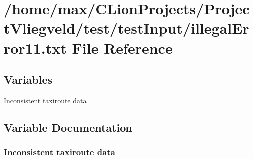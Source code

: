 \hypertarget{illegalError11_8txt}{}\section{/home/max/\+C\+Lion\+Projects/\+Project\+Vliegveld/test/test\+Input/illegal\+Error11.txt File Reference}
\label{illegalError11_8txt}
\subsection*{Variables}
\begin{DoxyCompactItemize}
\item 
Inconsistent taxiroute \hyperlink{illegalError11_8txt_a2db91b8ae553a8888179c8dd6e74453f}{data}
\end{DoxyCompactItemize}


\subsection{Variable Documentation}
\subsubsection[{\texorpdfstring{data}{data}}]{\setlength{\rightskip}{0pt plus 5cm}Inconsistent taxiroute data}\hypertarget{illegalError11_8txt_a2db91b8ae553a8888179c8dd6e74453f}{}\label{illegalError11_8txt_a2db91b8ae553a8888179c8dd6e74453f}
